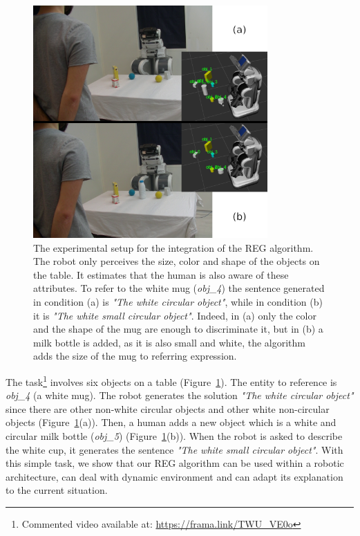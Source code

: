 \documentclass[a4paper,11pt,twoside]{StyleThese}
\begin{document}
\begin{figure}[hbtp]
\centering
\includegraphics[width=0.8\textwidth]{figures/chapter3/REGIntegration.png}
\caption{The experimental setup for the integration of the REG algorithm. The robot only perceives the size, color and shape of the objects on the table. It estimates that the human is also aware of these attributes. To refer to the white mug (\textit{obj\_4}) the sentence generated in condition (a) is \textit{"The white circular object"}, while in condition (b) it is \textit{"The white small circular object"}. Indeed, in (a) only the color and the shape of the mug are enough to discriminate it, but in (b) a milk bottle is added, as it is also small and white, the algorithm adds the size of the mug to referring expression.}
\label{fig:setupintegrationreg}
\end{figure}

The task\footnote{Commented video available at: \url{https://frama.link/TWU\_VE0o}} involves six objects on a table (Figure~\ref{fig:setupintegrationreg}). The entity to reference is \textit{obj\_4} (a white mug). The robot generates the solution \textit{"The white circular object"} since there are other non-white circular objects and other white non-circular objects (Figure~\ref{fig:setupintegrationreg}(a)). Then, a human adds a new object which is a white and circular milk bottle (\textit{obj\_5}) (Figure~\ref{fig:setupintegrationreg}(b)). When the robot is asked to describe the white cup, it generates the sentence \textit{"The white small circular object"}. With this simple task, we show that our REG algorithm can be used within a robotic architecture, can deal with dynamic environment and can adapt its explanation to the current situation.
\end{document}
